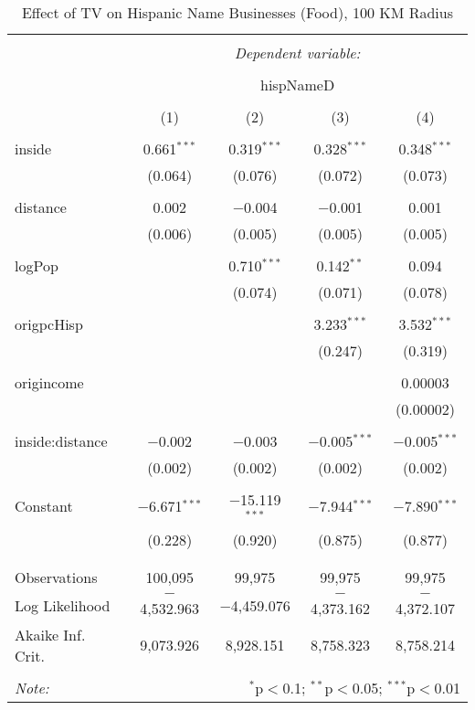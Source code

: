 
\begin{table}[!htbp] \centering 
  \caption{Effect of TV on Hispanic Name Businesses (Food), 100 KM Radius} 
  \label{} 
\begin{tabular}{@{\extracolsep{-5pt}}lcccc} 
\\[-1.8ex]\hline 
\hline \\[-1.8ex] 
 & \multicolumn{4}{c}{\textit{Dependent variable:}} \\ 
\cline{2-5} 
\\[-1.8ex] & \multicolumn{4}{c}{hispNameD} \\ 
\\[-1.8ex] & (1) & (2) & (3) & (4)\\ 
\hline \\[-1.8ex] 
 inside & 0.661$^{***}$ & 0.319$^{***}$ & 0.328$^{***}$ & 0.348$^{***}$ \\ 
  & (0.064) & (0.076) & (0.072) & (0.073) \\ 
  & & & & \\ 
 distance & 0.002 & $-$0.004 & $-$0.001 & 0.001 \\ 
  & (0.006) & (0.005) & (0.005) & (0.005) \\ 
  & & & & \\ 
 logPop &  & 0.710$^{***}$ & 0.142$^{**}$ & 0.094 \\ 
  &  & (0.074) & (0.071) & (0.078) \\ 
  & & & & \\ 
 origpcHisp &  &  & 3.233$^{***}$ & 3.532$^{***}$ \\ 
  &  &  & (0.247) & (0.319) \\ 
  & & & & \\ 
 origincome &  &  &  & 0.00003 \\ 
  &  &  &  & (0.00002) \\ 
  & & & & \\ 
 inside:distance & $-$0.002 & $-$0.003 & $-$0.005$^{***}$ & $-$0.005$^{***}$ \\ 
  & (0.002) & (0.002) & (0.002) & (0.002) \\ 
  & & & & \\ 
 Constant & $-$6.671$^{***}$ & $-$15.119$^{***}$ & $-$7.944$^{***}$ & $-$7.890$^{***}$ \\ 
  & (0.228) & (0.920) & (0.875) & (0.877) \\ 
  & & & & \\ 
\hline \\[-1.8ex] 
Observations & 100,095 & 99,975 & 99,975 & 99,975 \\ 
Log Likelihood & $-$4,532.963 & $-$4,459.076 & $-$4,373.162 & $-$4,372.107 \\ 
Akaike Inf. Crit. & 9,073.926 & 8,928.151 & 8,758.323 & 8,758.214 \\ 
\hline 
\hline \\[-1.8ex] 
\textit{Note:}  & \multicolumn{4}{r}{$^{*}$p$<$0.1; $^{**}$p$<$0.05; $^{***}$p$<$0.01} \\ 
\end{tabular} 
\end{table} 
